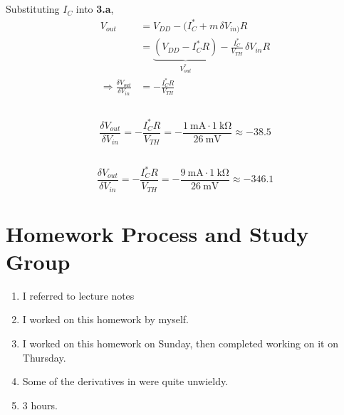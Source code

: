 \documentclass[]{article}
\begin{document}
\subsection{}

Substituting \(I_C\) into \textbf{3.a},
\begin{align}
	V_{out} &= V_{DD} - (I_{C}^\ast + m \, \delta V_{in)} R \\
	&= \underbrace{(V_{DD} - I_C^\ast R)}_{V_{out}^\ast} - \frac{I_C^\ast}{V_{TH}} \, \delta V_{in} R \\
	\Rightarrow \frac{\delta V_{out}}{\delta V_{in}} &= -\frac{I_C^\ast R}{V_{TH}}
\end{align}

\subsection{}

\begin{equation}
	\frac{\delta V_{out}}{\delta V_{in}} = -\frac{I_C^\ast R}{V_{TH}} = -\frac{\SI{1}{\milli\ampere} \cdot \SI{1}{\kilo\ohm}}{\SI{26}{\milli\volt}} \approx -38.5
\end{equation}

\subsection{}

\begin{equation}
	\frac{\delta V_{out}}{\delta V_{in}} = -\frac{I_C^\ast R}{V_{TH}} = -\frac{\SI{9}{\milli\ampere} \cdot \SI{1}{\kilo\ohm}}{\SI{26}{\milli\volt}} \approx -346.1
\end{equation}


\section{Homework Process and Study Group}

\begin{enumerate}
	\item I referred to lecture notes
	\item I worked on this homework by myself.
	\item I worked on this homework on Sunday, then completed working on it on Thursday.
	\item Some of the derivatives in  were quite unwieldy.
	\item 3 hours.
\end{enumerate}

%
\end{document}
